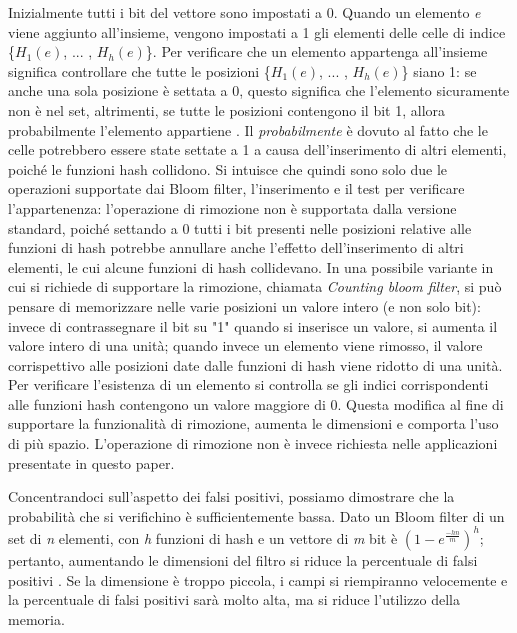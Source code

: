 \documentclass[../main.tex]{subfiles}
\begin{document}
Inizialmente tutti i bit del vettore sono impostati a 0. Quando un elemento \textit{e} viene aggiunto all'insieme, vengono impostati a 1 gli elementi delle celle di indice \{$H_{1}(e)$, ... , $H_{h}(e)$\}. Per verificare che un elemento appartenga all'insieme significa controllare che tutte le posizioni \{$H_{1}(e)$, ... , $H_{h}(e)$\} siano 1: se anche una sola posizione è settata a 0, questo significa che l'elemento sicuramente non è nel set, altrimenti, se tutte le posizioni contengono il bit 1, allora probabilmente l'elemento appartiene \cite{compressedbloomfilter}. Il \textit{probabilmente} è dovuto al fatto che le celle potrebbero essere state settate a 1 a causa dell'inserimento di altri elementi, poiché le funzioni hash collidono. Si intuisce che quindi sono solo due le operazioni supportate dai Bloom filter, l'inserimento e il test per verificare l'appartenenza: l'operazione di rimozione non è supportata dalla versione standard, poiché settando a 0 tutti i bit presenti nelle posizioni relative alle funzioni di hash potrebbe annullare anche l'effetto dell'inserimento di altri elementi, le cui alcune funzioni di hash collidevano. In una possibile variante in cui si richiede di supportare la rimozione, chiamata \textit{Counting bloom filter}, si può pensare di memorizzare nelle varie posizioni un valore intero (e non solo bit): invece di contrassegnare il bit su "1" quando si inserisce un valore, si aumenta il valore intero di una unità; quando invece un elemento viene rimosso, il valore corrispettivo alle posizioni date dalle funzioni di hash viene ridotto di una unità. Per verificare l'esistenza di un elemento si controlla se gli indici corrispondenti alle funzioni hash contengono un valore maggiore di 0. Questa modifica al fine di supportare la funzionalità di rimozione, aumenta le dimensioni e comporta l'uso di più spazio. L'operazione di rimozione non è invece richiesta nelle applicazioni presentate in questo paper.

Concentrandoci sull'aspetto dei falsi positivi, possiamo dimostrare che la probabilità che si verifichino è sufficientemente bassa. Dato un Bloom filter di un set di \textit{n} elementi, con \textit{h} funzioni di hash e un vettore di \textit{m} bit è $(1 - e^{\frac{-hn}{m}})^{h} $; pertanto, aumentando le dimensioni del filtro si riduce la percentuale di falsi positivi \cite{bernardini2019malva} \cite{compressedbloomfilter}. Se la dimensione è troppo piccola, i campi si riempiranno velocemente e la percentuale di falsi positivi sarà molto alta, ma si riduce l'utilizzo della memoria. 
\end{document}
